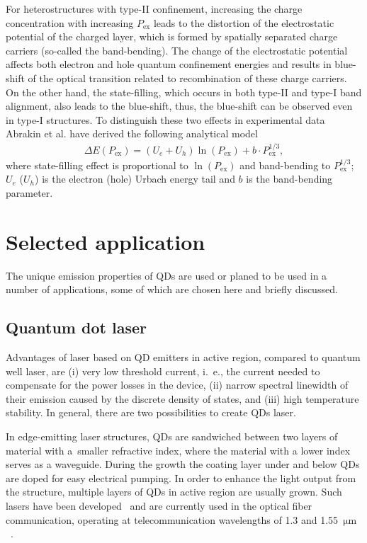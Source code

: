 \documentclass[
a4paper, %
11pt, %
onecolumn, %
openany, %
oldfontcommands,
]{memoir}
\begin{document}
For heterostructures with type-II confinement, increasing the charge concentration with increasing $P_\mathrm{ex}$ leads to the distortion of the electrostatic potential of the charged layer, which is formed by spatially separated charge carriers (so-called the band-bending). The change of the electrostatic potential affects both electron and hole quantum confinement energies and results in blue-shift of the optical transition related to recombination of these charge carriers. On the other hand, the state-filling, which occurs in both type-II and type-I band alignment, also leads to the blue-shift, thus, the blue-shift can be observed even in type-I structures. To distinguish these two effects in experimental data Abrakin et al. have derived the following analytical model~\cite{Abramkin_blueshift_analytical}
\begin{eqnarray}
\Delta E\left(P_\mathrm{ex}\right)=\left(U_e+U_h\right)\ln\left(P_\mathrm{ex}\right) + b\cdot P_\mathrm{ex}^{1/3},
\end{eqnarray}
where state-filling effect is proportional to $\ln\left( P_\mathrm{ex} \right)$ and band-bending to $P_\mathrm{ex}^{1/3}$; $U_e$ ($U_h$) is the electron (hole) Urbach energy tail and $b$ is the band-bending parameter.




\section{Selected application}
The unique emission properties of QDs are used or planed to be used in a number of applications, some of which are chosen here and briefly discussed.
\subsection*{Quantum dot laser}
Advantages of laser based on QD emitters in active region, compared to quantum well laser, are (i) very low threshold current, i.~e., the current needed to compensate for the power losses in the device, (ii) narrow spectral linewidth of their emission caused by the discrete density of states, and (iii) high temperature stability. In general, there are two possibilities to create QDs laser.

In edge-emitting laser structures, QDs are sandwiched between two layers of material with a~smaller refractive index, where the material with a lower index serves as a waveguide. During the growth the coating layer under and below QDs are doped for easy electrical pumping. In order to enhance the light output from the structure, multiple layers of QDs in active region are usually grown. Such lasers have been developed~\cite{Kirstaedter,SellinAPL,SellinEL,Kovsh,Ledentsov} and are currently used in the optical fiber communication, operating at telecommunication wavelengths of 1.3 and 1.55~$\mathrm{\mu m}$~\cite{QDlaser}. 
\end{document}
